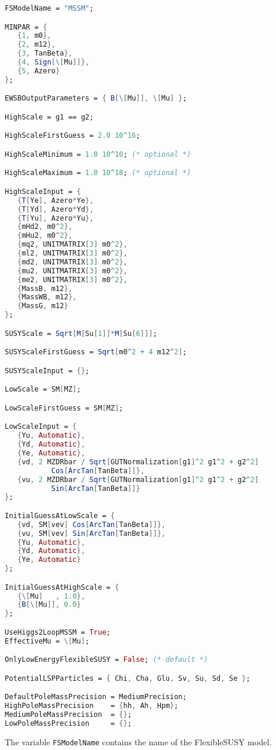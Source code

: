 \documentclass[final,3p,11pt,pdflatex]{elsarticle}
\makeatletter
\newcommand{\fs}{FlexibleSUSY\@\xspace}
\newcommand{\code}[1]{\lstinline|#1|}  %
\makeatother
\begin{document}
\begin{lstlisting}[language=Mathematica]
FSModelName = "MSSM";

MINPAR = {
   {1, m0},
   {2, m12},
   {3, TanBeta},
   {4, Sign[\[Mu]]},
   {5, Azero}
};

EWSBOutputParameters = { B[\[Mu]], \[Mu] };

HighScale = g1 == g2;

HighScaleFirstGuess = 2.0 10^16;

HighScaleMinimum = 1.0 10^10; (* optional *)

HighScaleMaximum = 1.0 10^18; (* optional *)

HighScaleInput = {
   {T[Ye], Azero*Ye},
   {T[Yd], Azero*Yd},
   {T[Yu], Azero*Yu},
   {mHd2, m0^2},
   {mHu2, m0^2},
   {mq2, UNITMATRIX[3] m0^2},
   {ml2, UNITMATRIX[3] m0^2},
   {md2, UNITMATRIX[3] m0^2},
   {mu2, UNITMATRIX[3] m0^2},
   {me2, UNITMATRIX[3] m0^2},
   {MassB, m12},
   {MassWB, m12},
   {MassG, m12}
};

SUSYScale = Sqrt[M[Su[1]]*M[Su[6]]];

SUSYScaleFirstGuess = Sqrt[m0^2 + 4 m12^2];

SUSYScaleInput = {};

LowScale = SM[MZ];

LowScaleFirstGuess = SM[MZ];

LowScaleInput = {
   {Yu, Automatic},
   {Yd, Automatic},
   {Ye, Automatic},
   {vd, 2 MZDRbar / Sqrt[GUTNormalization[g1]^2 g1^2 + g2^2]
           Cos[ArcTan[TanBeta]]},
   {vu, 2 MZDRbar / Sqrt[GUTNormalization[g1]^2 g1^2 + g2^2]
           Sin[ArcTan[TanBeta]]}
};

InitialGuessAtLowScale = {
   {vd, SM[vev] Cos[ArcTan[TanBeta]]},
   {vu, SM[vev] Sin[ArcTan[TanBeta]]},
   {Yu, Automatic},
   {Yd, Automatic},
   {Ye, Automatic}
};

InitialGuessAtHighScale = {
   {\[Mu]   , 1.0},
   {B[\[Mu]], 0.0}
};

UseHiggs2LoopMSSM = True;
EffectiveMu = \[Mu];

OnlyLowEnergyFlexibleSUSY = False; (* default *)

PotentialLSPParticles = { Chi, Cha, Glu, Sv, Su, Sd, Se };

DefaultPoleMassPrecision = MediumPrecision;
HighPoleMassPrecision    = {hh, Ah, Hpm};
MediumPoleMassPrecision  = {};
LowPoleMassPrecision     = {};
\end{lstlisting}
%
The variable \code{FSModelName} contains the name of the \fs model.
\end{document}
